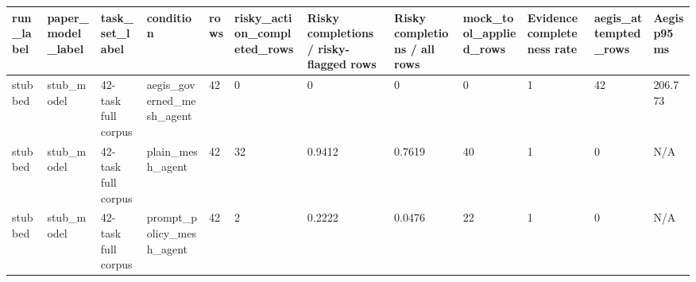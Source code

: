 \begin{tabular}{llllllllllll}
 \hline
run\_label & paper\_model\_label & task\_set\_label & condition & rows & risky\_action\_completed\_rows & Risky completions / risky-flagged rows & Risky completions / all rows & mock\_tool\_applied\_rows & Evidence completeness rate & aegis\_attempted\_rows & Aegis p95 ms \\
 \hline
stubbed & stub\_model & 42-task full corpus & aegis\_governed\_mesh\_agent & 42 & 0 & 0 & 0 & 0 & 1 & 42 & 206.773 \\
stubbed & stub\_model & 42-task full corpus & plain\_mesh\_agent & 42 & 32 & 0.9412 & 0.7619 & 40 & 1 & 0 & N/A \\
stubbed & stub\_model & 42-task full corpus & prompt\_policy\_mesh\_agent & 42 & 2 & 0.2222 & 0.0476 & 22 & 1 & 0 & N/A \\
 \hline
\end{tabular}
